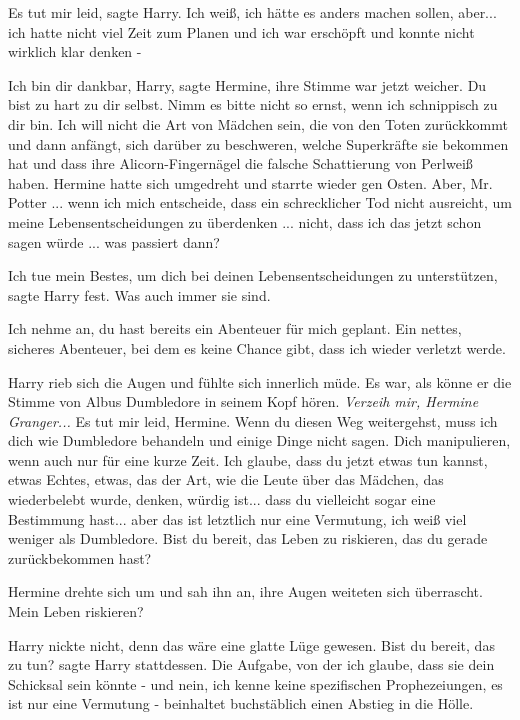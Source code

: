 \glqq{}Es tut mir leid\grqq{}, sagte Harry. \glqq{}Ich weiß, ich hätte es anders
machen sollen, aber... ich hatte nicht viel Zeit zum Planen und ich war
erschöpft und konnte nicht wirklich klar denken -\grqq{}

\glqq{}Ich bin dir dankbar, Harry\grqq{}, sagte Hermine, ihre Stimme war jetzt
weicher. \glqq{}Du bist zu hart zu dir selbst. Nimm es bitte nicht so ernst, wenn
ich schnippisch zu dir bin. Ich will nicht die Art von Mädchen sein, die von den
Toten zurückkommt und dann anfängt, sich darüber zu beschweren, welche
Superkräfte sie bekommen hat und dass ihre Alicorn-Fingernägel die falsche
Schattierung von Perlweiß haben.\grqq{} Hermine hatte sich umgedreht und starrte
wieder gen Osten. \glqq{}Aber, Mr. Potter ... wenn ich mich entscheide, dass ein
schrecklicher Tod nicht ausreicht, um meine Lebensentscheidungen zu überdenken
... nicht, dass ich das jetzt schon sagen würde ... was passiert dann?\grqq{}

\glqq{}Ich tue mein Bestes, um dich bei deinen Lebensentscheidungen zu
unterstützen\grqq{}, sagte Harry fest. \glqq{}Was auch immer sie sind.\grqq{}

\glqq{}Ich nehme an, du hast bereits ein Abenteuer für mich geplant. Ein nettes,
sicheres Abenteuer, bei dem es keine Chance gibt, dass ich wieder verletzt
werde.\grqq{}

Harry rieb sich die Augen und fühlte sich innerlich müde. Es war, als könne er
die Stimme von Albus Dumbledore in seinem Kopf hören.
\emph{Verzeih mir, Hermine Granger...}
\glqq{}Es tut mir leid, Hermine. Wenn du diesen Weg weitergehst, muss ich dich
wie Dumbledore behandeln und einige Dinge nicht sagen. Dich manipulieren, wenn
auch nur für eine kurze Zeit. Ich glaube, dass du jetzt etwas tun kannst, etwas
Echtes, etwas, das der Art, wie die Leute über das Mädchen, das wiederbelebt
wurde, denken, würdig ist... dass du vielleicht sogar eine Bestimmung hast...
aber das ist letztlich nur eine Vermutung, ich weiß viel weniger als Dumbledore.
Bist du bereit, das Leben zu riskieren, das du gerade zurückbekommen
hast?\grqq{}

Hermine drehte sich um und sah ihn an, ihre Augen weiteten sich überrascht.
\glqq{}Mein Leben riskieren?\grqq{}

Harry nickte nicht, denn das wäre eine glatte Lüge gewesen. \glqq{}Bist du
bereit, das zu tun?\grqq{} sagte Harry stattdessen. \glqq{}Die Aufgabe, von der
ich glaube, dass sie dein Schicksal sein könnte - und nein, ich kenne keine
spezifischen Prophezeiungen, es ist nur eine Vermutung - beinhaltet buchstäblich
einen Abstieg in die Hölle.\grqq{}

